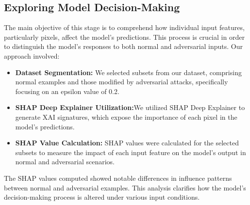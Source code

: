 \documentclass[10pt, conference, a4paper, final]{IEEEtran}
\begin{document}
\subsection{Exploring Model Decision-Making}
 The main objective of this stage is to comprehend how individual input features, particularly pixels, affect the model's predictions. 
 This process is crucial in order to distinguish the model's responses to both normal and adversarial inputs.
Our approach involved:
\begin{itemize}
    \item \textbf{Dataset Segmentation:} We selected subsets from our dataset, comprising normal examples and those modified by adversarial 
    attacks, specifically focusing on an epsilon value of 0.2.
    \item \textbf{SHAP Deep Explainer Utilization:}We utilized SHAP Deep Explainer to generate XAI signatures, which expose the importance 
    of each pixel in the model's predictions.

    \item \textbf{SHAP Value Calculation:} SHAP values were calculated for the selected subsets to measure the impact of each input feature 
    on the model's output in normal and adversarial scenarios.

\end{itemize}

The SHAP values computed showed notable differences in influence patterns between normal and adversarial examples. This analysis clarifies 
how the model's decision-making process is altered under various input conditions.
\end{document}
